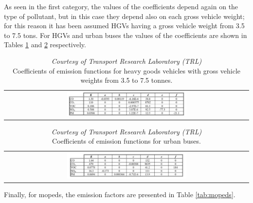 \documentclass[journal]{IEEEtran}
\begin{document}
As seen in the first category, the values of the coefficients depend again on the type of pollutant, but in this case they depend also on each gross vehicle weight; for this reason it has been assumed HGVs having a gross vehicle weight from 3.5 to 7.5 tons. For HGVs and urban buses the values of the coefficients are shown in Tables \ref{tab:hgv} and \ref{tab:urbanbus} respectively.
\begin{table}[tbp]
 \centering
 \begin{center}  
  \begin{tabular}{c}
      \includegraphics[width=0.5\textwidth]{figure/tab_coef_hgv.jpg} 
  \end{tabular}
\end{center}  
\caption{\textit{Courtesy of Transport Research Laboratory (TRL)} \cite{bib:MEET001}\\ Coefficients of emission functions for heavy goods vehicles with gross vehicle weights from 3.5 to 7.5 tonnes.}
  \label{tab:hgv}
\end{table}
\begin{table}[tbp]
 \centering
 \begin{center}  
  \begin{tabular}{c}
      \includegraphics[width=0.5\textwidth]{figure/tab_coef_uBuses.jpg}
  \end{tabular}
\end{center}  
\caption{\textit{Courtesy of Transport Research Laboratory (TRL)} \cite{bib:MEET001}\\Coefficients of emission functions for urban buses.}
  \label{tab:urbanbus}
\end{table}
Finally, for mopeds, the emission factors are presented in Table \ref{tab:mopeds}. \\
\end{document}
